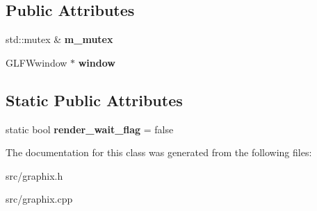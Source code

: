 \subsection*{Public Attributes}
\begin{DoxyCompactItemize}
\item 
\mbox{\label{classGraphix_ab2136667d30ca5f0017bceded579a803}} 
std\+::mutex \& {\bfseries m\+\_\+mutex}
\item 
\mbox{\label{classGraphix_a8189df95428d2fda74b1becb84ed07c2}} 
G\+L\+F\+Wwindow $\ast$ {\bfseries window}
\end{DoxyCompactItemize}
\subsection*{Static Public Attributes}
\begin{DoxyCompactItemize}
\item 
\mbox{\label{classGraphix_abfd52cde22d5ea3f3b159cc4d5569853}} 
static bool {\bfseries render\+\_\+wait\+\_\+flag} = false
\end{DoxyCompactItemize}


The documentation for this class was generated from the following files\+:\begin{DoxyCompactItemize}
\item 
src/graphix.\+h\item 
src/graphix.\+cpp\end{DoxyCompactItemize}
